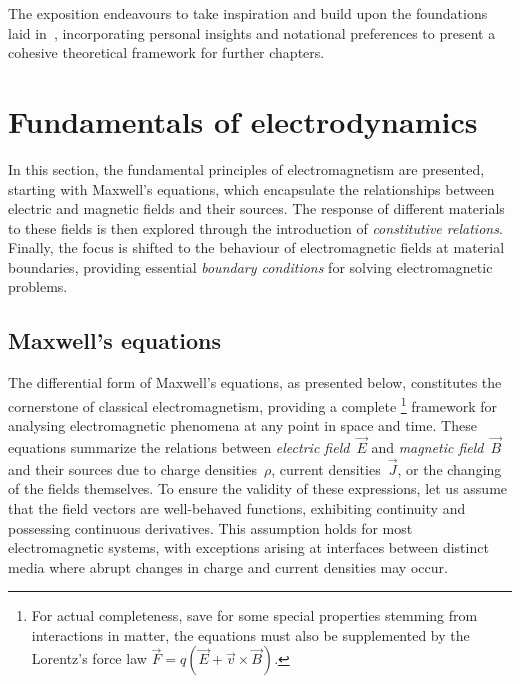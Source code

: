 \documentclass[11pt,a4paper,twoside,openany]{report}
\begin{document}
The exposition endeavours to take inspiration and build upon the foundations laid in~\parencite{balanis:advanced-engineering-electromagnetics,griffiths:introduction-to-electrodynamics,zangwill:modern-electrodynamics}, incorporating personal insights and notational preferences to present a cohesive theoretical framework for further chapters.

\section{Fundamentals of electrodynamics}
\label{section:fundamentals-of-electrodynamics}
In this section, the fundamental principles of electromagnetism are presented, starting with Maxwell's equations, which encapsulate the relationships between electric and magnetic fields and their sources. The response of different materials to these fields is then explored through the introduction of \emph{constitutive relations}. Finally, the focus is shifted to the behaviour of electromagnetic fields at material boundaries, providing essential \emph{boundary conditions} for solving electromagnetic problems.

\subsection{Maxwell's equations}
The differential form of Maxwell's equations, as presented below, constitutes the cornerstone of classical electromagnetism, providing a complete%
    \footnote{For actual completeness, save for some special properties stemming from interactions in matter, the equations must also be supplemented by the Lorentz's force law $\vec F = q(\vec E + \vec v \times \vec B)$.}
framework for analysing electromagnetic phenomena at any point in space and time. These equations summarize the relations between \emph{electric field}~$\vec E$ and \emph{magnetic field}~$\vec B$ and their sources due to charge densities~$\rho$, current densities~$\vec J$, or the changing of the fields themselves. To ensure the validity of these expressions, let us assume that the field vectors are well-behaved functions, exhibiting continuity and possessing continuous derivatives. This assumption holds for most electromagnetic systems, with exceptions arising at interfaces between distinct media where abrupt changes in charge and current densities may occur.
\end{document}
